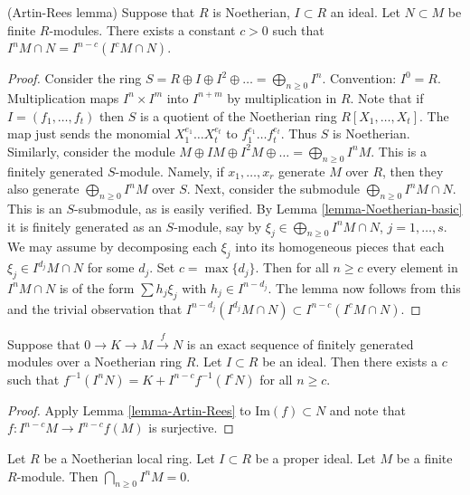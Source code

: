 \begin{lemma}
\label{lemma-Artin-Rees}
(Artin-Rees lemma)
Suppose that $R$ is Noetherian, $I \subset R$ an ideal.
Let $N \subset M$ be finite $R$-modules.
There exists a constant $c > 0$ such that
$I^n M \cap N  =  I^{n-c}(I^cM \cap N)$.
\end{lemma}

\begin{proof}
Consider the ring $S = R \oplus I \oplus I^2 \oplus \ldots
= \bigoplus_{n \geq 0} I^n$. Convention: $I^0 = R$.
Multiplication maps $I^n \times I^m$
into $I^{n + m}$ by multiplication in $R$.
Note that if $I = (f_1, \ldots, f_t)$
then $S$ is a quotient of the Noetherian ring $R[X_1, \ldots, X_t]$.
The map just sends the monomial $X_1^{e_1}\ldots X_t^{e_t}$
to $f_1^{e_1}\ldots f_t^{e_t}$. Thus $S$ is Noetherian.
Similarly, consider the module $M \oplus IM \oplus I^2M \oplus \ldots
= \bigoplus_{n \geq 0} I^nM$. This is a finitely generated $S$-module.
Namely, if $x_1, \ldots, x_r$ generate $M$ over $R$, then they also generate
$\bigoplus_{n \geq 0} I^nM$ over $S$. Next, consider the
submodule $\bigoplus_{n \geq 0} I^nM \cap N$.
This is an $S$-submodule, as is easily verified. By
Lemma \ref{lemma-Noetherian-basic} it is finitely generated as
an $S$-module,
say by $\xi_j \in \bigoplus_{n \geq 0} I^nM \cap N$, $j = 1, \ldots, s$.
We may assume by decomposing each $\xi_j$ into its homogeneous
pieces that each $\xi_j \in I^{d_j}M \cap N$ for some $d_j$.
Set $c = \max\{d_j\}$. Then for all $n \geq c$ every element
in $I^nM \cap N$ is of the form $\sum h_j \xi_j$ with
$h_j \in I^{n - d_j}$. The lemma now follows from this and the trivial
observation that $I^{n-d_j}(I^{d_j}M \cap N) \subset I^{n-c}(I^cM \cap N)$.
\end{proof}

\begin{lemma}
\label{lemma-map-AR}
Suppose that $0 \to K \to M \xrightarrow{f} N$ is an
exact sequence of finitely generated modules
over a Noetherian ring $R$. Let $I \subset R$ be an ideal.
Then there exists a $c$ such that $f^{-1}(I^nN)
= K + I^{n-c}f^{-1}(I^cN)$ for all $n \geq c$.
\end{lemma}

\begin{proof}
Apply Lemma \ref{lemma-Artin-Rees} to
$\text{Im}(f) \subset N$ and note that
$f : I^{n-c}M \to I^{n-c}f(M)$ is surjective.
\end{proof}

\begin{lemma}
\label{lemma-intersect-powers-ideal-module-zero}
Let $R$ be a Noetherian local ring. Let $I \subset R$ be
a proper ideal. Let $M$ be a finite $R$-module.
Then $\bigcap_{n \geq 0} I^nM = 0$.
\end{lemma}

